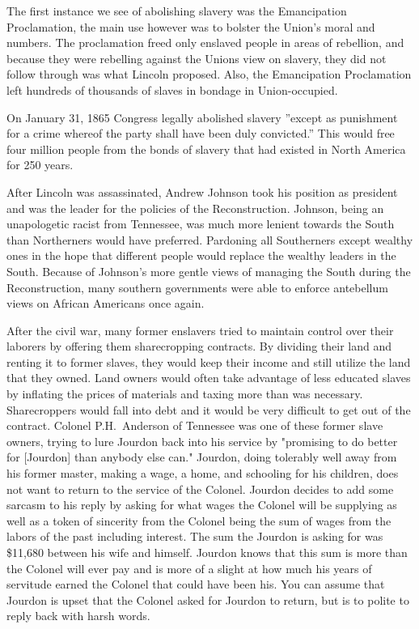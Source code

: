 The first instance we see of abolishing slavery was the Emancipation Proclamation, the main use however was to bolster the Union's moral and numbers.
The proclamation freed only enslaved people in areas of rebellion, and because they were rebelling against the Unions view on slavery, they did not follow through was what Lincoln proposed.
Also, the Emancipation Proclamation left hundreds of thousands of slaves in bondage in Union-occupied.

On January 31, 1865 Congress legally abolished slavery ''except as punishment for a crime whereof the party shall have been duly convicted.''
This would free four million people from the bonds of slavery that had existed in North America for 250 years. %

After Lincoln was assassinated, Andrew Johnson took his position as president and was the leader for the policies of the Reconstruction.
Johnson, being an unapologetic racist from Tennessee, was much more lenient towards the South than Northerners would have preferred.
Pardoning all Southerners except wealthy ones in the hope that different people would replace the wealthy leaders in the South.
Because of Johnson's more gentle views of managing the South during the Reconstruction, many southern governments were able to enforce antebellum views on African Americans once again.

After the civil war, many former enslavers tried to maintain control over their laborers by offering them sharecropping contracts.
By dividing their land and renting it to former slaves, they would keep their income and still utilize the land that they owned.
Land owners would often take advantage of less educated slaves by inflating the prices of materials and taxing more than was necessary.
Sharecroppers would fall into debt and it would be very difficult to get out of the contract.
Colonel P.H.\ Anderson of Tennessee was one of these former slave owners, trying to lure Jourdon back into his service by "promising to do better for [Jourdon] than anybody else can."
Jourdon, doing tolerably well away from his former master, making a wage, a home, and schooling for his children, does not want to return to the service of the Colonel.
Jourdon decides to add some sarcasm to his reply by asking for what wages the Colonel will be supplying as well as a token of sincerity from the Colonel being the sum of wages from the labors of the past including interest.
The sum the Jourdon is asking for was \$11,680 between his wife and himself.
Jourdon knows that this sum is more than the Colonel will ever pay and is more of a slight at how much his years of servitude earned the Colonel that could have been his.
You can assume that Jourdon is upset that the Colonel asked for Jourdon to return, but is to polite to reply back with harsh words.

